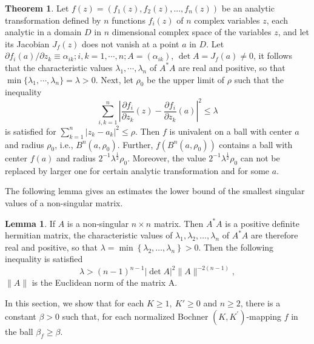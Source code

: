 \documentclass[a4paper,12pt,reqno]{amsart}
\theoremstyle{plain}
\theoremstyle{definition}
\newtheorem{Thm}{Theorem}
\newtheorem{Lem}{Lemma}
\numberwithin{equation}{section}
\begin{document}
\begin{Thm}\cite{Takahashi-1951}\label{Takahashi}
Let $f(z)=\left(f_1(z),f_2(z),...,f_n(z)\right)$ be an analytic transformation defined by $n$ functions $f_i(z)$ of $n$ complex variables $z$, each analytic in a domain $D$ in $n$ dimensional complex space of the variables $z$, and let its Jacobian $J_f(z)$ does not vanish at a point $a$ in $D$. Let $\partial f_i(a) / \partial z_k \equiv \alpha_{i k} ; i, k=1, \cdots, n ; A=\left(\alpha_{i k}\right)$, $\operatorname{det} A=J_f(a) \neq 0$, it follows that the characteristic values $\lambda_1, \cdots, \lambda_n$ of $A^*A$ are real and positive, so that $\min \{\lambda_1, \cdots, \lambda_n\}=\lambda>0$. Next, let $\rho_0$ be the upper limit of $\rho$ such that the inequality
$$
\sum_{i, k=1}^n\left|\frac{\partial f_i}{\partial z_k}(z)-\frac{\partial f_i}{\partial z_k}(a)\right|^2 \leq \lambda
$$
is satisfied for $\sum_{k=1}^{n} |z_k-a_k|^2\leq \rho$. Then $f$ is univalent on a ball with center $a$ and radius $\rho_0$, i.e., $B^n(a,\rho_0)$. Further, $f(B^n(a,\rho_0))$ contains a ball with center $f(a)$ and radius $2^{-1} \lambda^{\frac{1}{2}} \rho_0$. Moreover, the value $2^{-1} \lambda^{\frac{1}{2}} \rho_0$ can not be replaced by larger one for certain analytic transformation and for some $a$.
\end{Thm} 
\vspace{1.5mm}

The following lemma gives an estimates the lower bound of the smallest singular values of a non-singular matrix.

\begin{Lem}\label{lemma1}\cite{Yu-Gu-1997}
 If $A$ is a non-singular $n \times n$ matrix. Then $A^*A$ is a positive definite hermitian matrix, the characteristic values of $\lambda_1, \lambda_2, \ldots, \lambda_n$ of $A^* A$ are therefore real and positive, so that $\lambda=\min \left\{\lambda_2, \ldots, \lambda_n\right\}>0$. Then the following inequality is satisfied
$$
\lambda>(n-1)^{n-1}|\operatorname{det} A|^2\|A\|^{-2(n-1)},
$$
$\|A\|$ is the Euclidean norm of the matrix A.
\end{Lem}

\vspace{2mm}
In this section, we show that for each $K \geq 1, \ K' \geq 0$ and $n \geq 2$, there is a constant $\beta>0$ such that, for each normalized Bochner $\left(K, K^{\prime}\right)$-mapping $f$ in the ball $\beta_f \geq \beta$.
\end{document}
